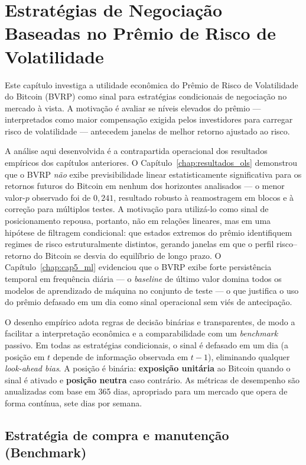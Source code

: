 ﻿\chapter{Estratégias de Negociação Baseadas no Prêmio de Risco de Volatilidade}
\label{chap:estrategias}

Este capítulo investiga a utilidade econômica do Prêmio de Risco de Volatilidade
do Bitcoin (BVRP) como sinal para estratégias condicionais de negociação no mercado
à vista. A motivação é avaliar se níveis elevados do prêmio --- interpretados como
maior compensação exigida pelos investidores para carregar risco de volatilidade ---
antecedem janelas de melhor retorno ajustado ao risco.

A análise aqui desenvolvida é a contrapartida operacional dos resultados empíricos
dos capítulos anteriores. O Capítulo~\ref{chap:resultados_ols} demonstrou que o
BVRP \emph{não} exibe previsibilidade linear estatisticamente significativa para os retornos futuros
do Bitcoin em nenhum dos horizontes analisados --- o menor valor-$p$ observado foi de $0{,}241$,
resultado robusto à reamostragem em blocos e à correção para múltiplos testes. A motivação para
utilizá-lo como sinal de posicionamento repousa, portanto, não em relações lineares, mas em uma
hipótese de filtragem condicional: que estados extremos do prêmio identifiquem regimes de risco
estruturalmente distintos, gerando janelas em que o perfil risco--retorno do Bitcoin se desvia do
equilíbrio de longo prazo. O Capítulo~\ref{chap:cap5_ml} evidenciou que o BVRP exibe forte
persistência temporal em frequência diária --- o \textit{baseline} de último valor
domina todos os modelos de aprendizado de máquina no conjunto de teste ---
o que justifica o uso do prêmio defasado em um dia como sinal operacional
sem viés de antecipação.

O desenho empírico adota regras de decisão binárias e transparentes, de modo a
facilitar a interpretação econômica e a comparabilidade com um \textit{benchmark}
passivo. Em todas as estratégias condicionais, o sinal é defasado em um dia
(a posição em $t$ depende de informação observada em $t-1$), eliminando
qualquer \textit{look-ahead bias}. A posição é binária: \textbf{exposição unitária}
ao Bitcoin quando o sinal é ativado e \textbf{posição neutra} caso contrário.
As métricas de desempenho são anualizadas com base em 365 dias, apropriado para
um mercado que opera de forma contínua, sete dias por semana.

\section{Estratégia de compra e manutenção (Benchmark)}
\label{sec:cap7_bh}

